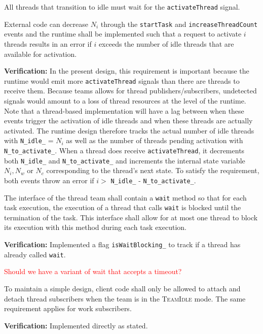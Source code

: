 \documentclass{article}
\newcommand{\TeamIdle}          {\textsc{TeamIdle}}
\begin{document}
\begin{req}
All threads that transition to idle must wait for the \texttt{activateThread}
signal.
\label{req:IdleActivateThread}
\end{req}

\begin{req}
External code can decrease $N_i$ through the \texttt{startTask} and
\texttt{increaseThreadCount} events and the runtime shall be implemented such
that a request to activate $i$ threads results in an error if $i$ exceeds the
number of idle threads that are available for activation.
\end{req}
\textbf{Verification:}\hspace{0.125in}  In the present design, this requirement
is important because the runtime would emit more \texttt{activateThread} signals
than there are threads to receive them.  Because teams allows for thread
publishers/subscribers, undetected signals would amount to a loss of thread
resources at the level of the runtime.  Note that a thread-based implementation
will have a lag between when these events trigger the activation of idle threads
and when these threads are actually activated.  The runtime design therefore
tracks the actual number of idle threads with \texttt{N\_idle\_} = $N_i$ as well
as the number of threads pending activation with \texttt{N\_to\_activate\_}.
When a thread does receive \texttt{activateThread}, it decrements both
\texttt{N\_idle\_} and \texttt{N\_to\_activate\_} and increments the internal
state variable $N_i, N_w$ or $N_c$ corresponding to the thread's next state.
To satisfy the requirement, both events throw an error if $i > $
\texttt{N\_idle\_} - \texttt{N\_to\_activate\_}.

\begin{req}
\label{req:Runtime_OneWait}
The interface of the thread team shall contain a \texttt{wait} method so that
for each task execution, the execution of a thread that calls \texttt{wait} is
blocked until the termination of the task.  This interface shall allow for at
most one thread to block its execution with this method during each task
execution.
\end{req}
\textbf{Verification:}\hspace{0.125in}  Implemented a flag
\texttt{isWaitBlocking\_} to track if a thread has already called \texttt{wait}.

\textcolor{red}{Should we have a variant of wait that accepts a timeout?}

\begin{req}
To maintain a simple design, client code shall only be allowed to attach and
detach thread subscribers when the team is in the {\TeamIdle} mode.  The same
requirement applies for work subscribers.
\end{req}
\textbf{Verification:}\hspace{0.125in} Implemented directly as stated.
\end{document}
